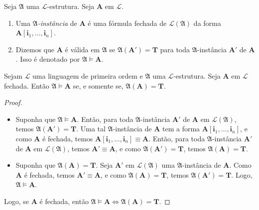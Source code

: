 \begin{definition}
    Seja $\mathfrak{A}$ uma $\mathcal{L}$-estrutura. Seja $\mathbf{A}$ em $\mathcal{L}$. 
        \begin{enumerate}[leftmargin=*, align=left, label=\textbf{(\alph*)}]
            \item Uma \emph{$\mathfrak{A}$-instância} de $\mathbf{A}$ é uma fórmula fechada de $\mathcal{L}(\mathfrak{A})$ da forma $\mathbf{A}[\mathbf{i}_1, \ldots, \mathbf{i}_n]$.
            \item Dizemos que $\mathbf{A}$ é válida em $\mathfrak{A}$ se $\mathfrak{A}(\mathbf{A}') = \mathbf{T}$ para toda $\mathfrak{A}$-instância $\mathbf{A}'$ de $\mathbf{A}$. Isso é denotado por $\mathfrak{A} \vDash \mathbf{A}$.
        \end{enumerate}
\end{definition}

\begin{proposition}
    Sejam $\mathcal{L}$ uma linguagem de primeira ordem e $\mathfrak{A}$ uma $\mathcal{L}$-estrutura. Seja $\mathbf{A}$ em $\mathcal{L}$ fechada. Então $\mathfrak{A} \vDash \mathbf{A}$ se, e somente se, $\mathfrak{A}(\mathbf{A}) = \mathbf{T}$.
\end{proposition}

\begin{proof}
    \leavevmode
        \begin{itemize}[align=left]
            \item[($\Rightarrow$)] Suponha que $\mathfrak{A} \vDash \mathbf{A}$. Então, para toda $\mathfrak{A}$-instância $\mathbf{A}'$ de $\mathbf{A}$ em $\mathcal{L}(\mathfrak{A})$, temos $\mathfrak{A}(\mathbf{A}') = \mathbf{T}$. Uma tal $\mathfrak{A}$-instância de $\mathbf{A}$ tem a forma $\mathbf{A}[\mathbf{i}_1, \ldots, \mathbf{i}_n]$, e como $\mathbf{A}$ é fechada, temos $\mathbf{A}[\mathbf{i}_1, \ldots, \mathbf{i}_n] \equiv \mathbf{A}$. Então, para toda $\mathfrak{A}$-instância $\mathbf{A}'$ de $\mathbf{A}$ em $\mathcal{L}(\mathfrak{A})$, temos $\mathbf{A}' \equiv \mathbf{A}$, e como $\mathfrak{A}(\mathbf{A}') = \mathbf{T}$, temos $\mathfrak{A}(\mathbf{A}) = \mathbf{T}$.
            \item[($\Leftarrow$)] Suponha que $\mathfrak{A}(\mathbf{A}) = \mathbf{T}$. Seja $\mathbf{A}'$ em $\mathcal{L}(\mathfrak{A})$ uma $\mathfrak{A}$-instância de $\mathbf{A}$.
            Como $\mathbf{A}$ é fechada, temos $\mathbf{A}' \equiv \mathbf{A}$, e como $\mathfrak{A}(\mathbf{A}) = \mathbf{T}$, temos $\mathfrak{A}(\mathbf{A}') = \mathbf{T}$. Logo, $\mathfrak{A} \vDash \mathbf{A}$.
        \end{itemize}
    Logo, se $\mathbf{A}$ é fechada, então $\mathfrak{A} \vDash \mathbf{A} \Leftrightarrow \mathfrak{A}(\mathbf{A}) = \mathbf{T}$. \blackproof
\end{proof}

